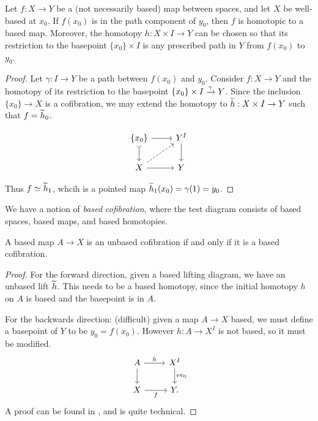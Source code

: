 \documentclass{article}[11pt]
\begin{document}
\begin{proposition} Let $f: X \to Y$ be a (not necessarily based) map between spaces, and let $X$ be well-based at $x_0$. If $f(x_0)$ is in the path component of $y_0$, then $f$ is homotopic to a based map. Moreover, the homotopy $h : X\times I \to Y$ can be chosen so that its restriction to the basepoint $\{x_0\} \times I$ is any prescribed path in $Y$ from $f(x_0)$ to $y_0$.
\end{proposition}

\begin{proof} Let $\gamma : I \to Y$ be a path between $f(x_0)$ and $y_0$. Consider $f: X \to Y$ and the homotopy of its restriction to the basepoint $\{x_0\} \times I \xrightarrow{\gamma} Y$. Since the inclusion $\{x_0\} \to X$ is a cofibration, we may extend the homotopy to $\widetilde{h} : X\times I \to Y$ such that $f = \widetilde{h}_0$.

\[
	\begin{tikzcd}
	\{x_0\}\dar[tail]\rar & Y^I\dar \\
	X\rar\ar[ur,dashed]& Y
	\end{tikzcd}
\]

Thus $f\simeq \widetilde{h}_1$, whcih is a pointed map $\widetilde{h}_1(x_0) = \gamma(1) = y_0$.

\end{proof}

\begin{note} We have a notion of \textit{based cofibration}, where the test diagram consists of based spaces, based maps, and based homotopies.
\end{note}

\begin{proposition} A based map $A \to X$ is an unbased cofibration if and only if it is a based cofibration.
\end{proposition}
\begin{proof} For the forward direction, given a based lifting diagram, we have an unbased lift $\widetilde{h}$. This needs to be a based homotopy, since the initial homotopy $h$ on $A$ is based and the basepoint is in $A$.

For the backwards direction: (difficult) given a map $A \to X$ based, we must define a basepoint of $Y$ to be $y_0 = f(x_0)$. However $h: A\to X^I$ is not based, so it must be modified.
\[
	\begin{tikzcd}
	A\dar\rar["h" above] & X^I\dar["\ev_0" right] \\
	X\rar["f" below] & Y.
	\end{tikzcd}
\] 
A proof can be found in \cite[VI, Section 5]{may}, and is quite technical. 
\end{proof}
\end{document}
